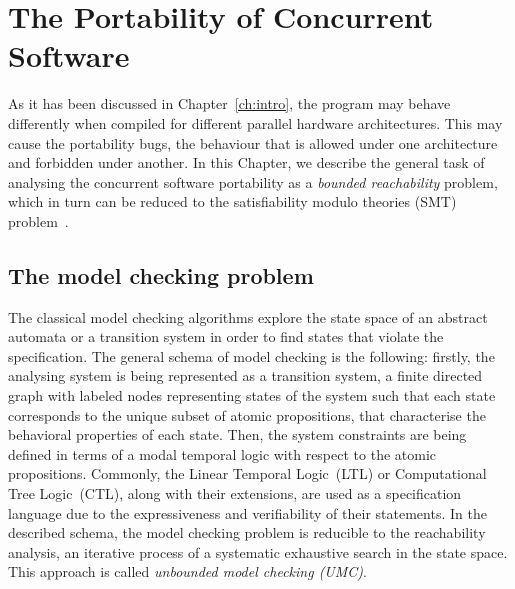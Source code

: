 \chapter{The Portability of Concurrent Software}
\label{ch:port}

As it has been discussed in Chapter~\ref{ch:intro}, the program may behave differently when compiled for different parallel hardware architectures. This may cause the portability bugs, the behaviour that is allowed under one architecture and forbidden under another. 
In this Chapter, we describe the general task of analysing the concurrent software portability
as a \textit{bounded reachability} problem, which in turn can be reduced to the satisfiability modulo theories (SMT) problem~\cite{Porthos17}.


\section{The model checking problem}
\label{ch:port:mc}

The classical model checking algorithms explore the state space of an abstract automata or a transition system in order to find states that violate the specification. The general schema of model checking is the following: firstly, the analysing system is being represented as a transition system, a finite directed graph with labeled nodes representing states of the system such that each state corresponds to the unique subset of atomic propositions, that characterise the behavioral properties of each state. 
Then, the system constraints are being defined in terms of a modal temporal logic with respect to the atomic propositions. Commonly, the Linear Temporal Logic~(LTL) or Computational Tree Logic~(CTL), along with their extensions, are used as a specification language due to the expressiveness and verifiability of their statements. 
In the described schema, the model checking problem is reducible to the reachability analysis, an iterative process of a systematic exhaustive search in the state space. This approach is called \textit{unbounded model checking (UMC)}.

